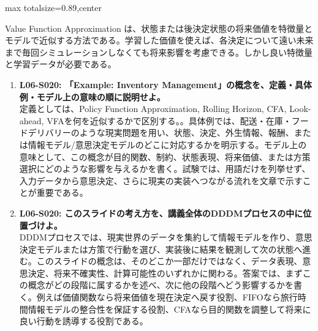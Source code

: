 \begin{minipage}[t]{0.58\textwidth}
\begin{adjustbox}{max totalsize={\textwidth}{0.89\textheight},center}
\begin{minipage}{\textwidth}
Value Function Approximation は、状態または後決定状態の将来価値を特徴量とモデルで近似する方法である。学習した価値を使えば、各決定について遠い未来まで毎回シミュレーションしなくても将来影響を考慮できる。しかし良い特徴量と学習データが必要である。\par{}\begin{enumerate}\item \textbf{L06-S020: 「Example: Inventory Management」の概念を、定義・具体例・モデル上の意味の順に説明せよ。}\\定義としては、Policy Function Approximation, Rolling Horizon, CFA, Look-ahead, VFAを何を近似するかで区別する。。具体例では、配送・在庫・フードデリバリーのような現実問題を用い、状態、決定、外生情報、報酬、または情報モデル/意思決定モデルのどこに対応するかを明示する。モデル上の意味として、この概念が目的関数、制約、状態表現、将来価値、または方策選択にどのような影響を与えるかを書く。試験では、用語だけを列挙せず、入力データから意思決定、さらに現実の実装へつながる流れを文章で示すことが重要である。\item \textbf{L06-S020: このスライドの考え方を、講義全体のDDDMプロセスの中に位置づけよ。}\\DDDMプロセスでは、現実世界のデータを集約して情報モデルを作り、意思決定モデルまたは方策で行動を選び、実装後に結果を観測して次の状態へ進む。このスライドの概念は、そのどこか一部だけではなく、データ表現、意思決定、将来不確実性、計算可能性のいずれかに関わる。答案では、まずこの概念がどの段階に属するかを述べ、次に他の段階へどう影響するかを書く。例えば価値関数なら将来価値を現在決定へ戻す役割、FIFOなら旅行時間情報モデルの整合性を保証する役割、CFAなら目的関数を調整して将来に良い行動を誘導する役割である。\end{enumerate}
\end{minipage}
\end{adjustbox}
\end{minipage}


